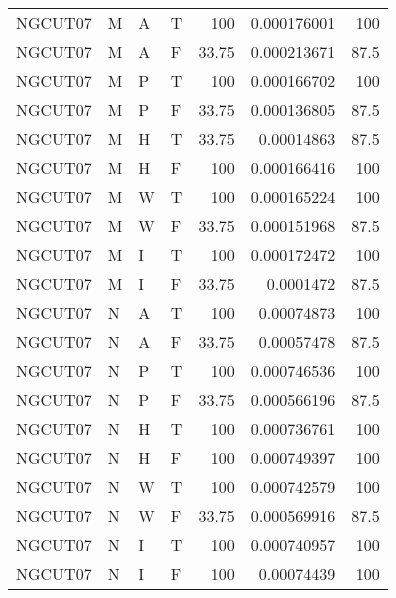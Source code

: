 \begin{tabular}{llllrrr}
    NGCUT07  & M     & A     & T          & 100        & 0.000176001 & 100      \\
    NGCUT07  & M     & A     & F          & 33.75      & 0.000213671 & 87.5     \\
    NGCUT07  & M     & P     & T          & 100        & 0.000166702 & 100      \\
    NGCUT07  & M     & P     & F          & 33.75      & 0.000136805 & 87.5     \\
    NGCUT07  & M     & H     & T          & 33.75      & 0.00014863  & 87.5     \\
    NGCUT07  & M     & H     & F          & 100        & 0.000166416 & 100      \\
    NGCUT07  & M     & W     & T          & 100        & 0.000165224 & 100      \\
    NGCUT07  & M     & W     & F          & 33.75      & 0.000151968 & 87.5     \\
    NGCUT07  & M     & I     & T          & 100        & 0.000172472 & 100      \\
    NGCUT07  & M     & I     & F          & 33.75      & 0.0001472   & 87.5     \\
    NGCUT07  & N     & A     & T          & 100        & 0.00074873  & 100      \\
    NGCUT07  & N     & A     & F          & 33.75      & 0.00057478  & 87.5     \\
    NGCUT07  & N     & P     & T          & 100        & 0.000746536 & 100      \\
    NGCUT07  & N     & P     & F          & 33.75      & 0.000566196 & 87.5     \\
    NGCUT07  & N     & H     & T          & 100        & 0.000736761 & 100      \\
    NGCUT07  & N     & H     & F          & 100        & 0.000749397 & 100      \\
    NGCUT07  & N     & W     & T          & 100        & 0.000742579 & 100      \\
    NGCUT07  & N     & W     & F          & 33.75      & 0.000569916 & 87.5     \\
    NGCUT07  & N     & I     & T          & 100        & 0.000740957 & 100      \\
    NGCUT07  & N     & I     & F          & 100        & 0.00074439  & 100      \\
    \hline
\end{tabular}